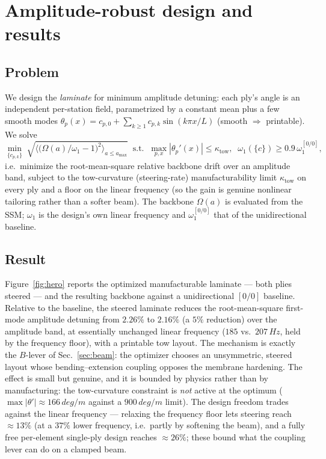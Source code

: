 \documentclass[11pt]{article}
\newcommand{\Om}{\Omega}
\begin{document}
\section{Amplitude-robust design and results}\label{sec:results}

\subsection{Problem}
We design the \emph{laminate} for minimum amplitude detuning: each ply's angle
is an independent per-station field, parametrized by a constant mean plus a few
smooth modes $\theta_p(x)=c_{p,0}+\sum_{k\ge1}c_{p,k}\sin(k\pi x/L)$ (smooth
$\Rightarrow$ printable). We solve
\begin{equation}
\min_{\{c_{p,k}\}}\;
\sqrt{\Big\langle\big(\Om(a)/\omega_1-1\big)^2\Big\rangle_{a\le a_{\max}}}
\;\;\text{s.t.}\;\;
\max_{p,x}|\theta_p'(x)|\le\kappa_{\mathrm{tow}},\;\;
\omega_1(\{c\})\ge 0.9\,\omega_1^{[0/0]},
\label{eq:opt}
\end{equation}
i.e.\ minimize the root-mean-square relative backbone drift over an amplitude
band, subject to the tow-curvature (steering-rate) manufacturability limit
$\kappa_{\mathrm{tow}}$ on every ply and a floor on the linear frequency (so the
gain is genuine nonlinear tailoring rather than a softer beam). The backbone
$\Om(a)$ is evaluated from the SSM; $\omega_1$ is the design's own linear
frequency and $\omega_1^{[0/0]}$ that of the unidirectional baseline.

\subsection{Result}
Figure~\ref{fig:hero} reports the optimized manufacturable laminate --- both plies
steered --- and the resulting backbone against a unidirectional $[0/0]$ baseline.
Relative to the baseline, the steered laminate reduces the root-mean-square
first-mode amplitude detuning from $2.26\%$ to $2.16\%$ (a $5\%$ reduction) over
the amplitude band, at essentially unchanged linear frequency
($185$ vs.\ $207\,\si{Hz}$, held by the frequency floor), with a printable tow
layout. The mechanism is exactly the $B$-lever of Sec.~\ref{sec:beam}: the
optimizer chooses an unsymmetric, steered layout whose bending--extension
coupling opposes the membrane hardening. The effect is small but genuine, and it
is bounded by physics rather than by manufacturing: the tow-curvature constraint
is \emph{not} active at the optimum ($\max|\theta'|\approx166\,\si{deg/m}$
against a $900\,\si{deg/m}$ limit). The design freedom trades against the linear
frequency --- relaxing the frequency floor lets steering reach $\approx13\%$ (at
a $37\%$ lower frequency, i.e.\ partly by softening the beam), and a fully free
per-element single-ply design reaches $\approx26\%$; these bound what the
coupling lever can do on a clamped beam.
\end{document}
